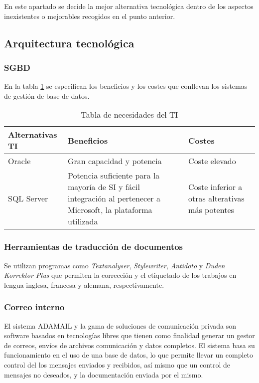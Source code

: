 \documentclass[11pt,a4paper,spanish,twoside]{report}
\begin{document}
En este apartado se decide la mejor alternativa tecnológica
dentro de los aspectos inexistentes o mejorables recogidos en el punto
anterior.

\subsection{Arquitectura tecnológica} \label{ss:7.2.1}
\subsubsection{SGBD}
En la tabla \ref{Tab:TabNecTI} se especifican los beneficios y los costes que
conllevan los sistemas de gestión de base de datos.
\begin{table}[!h]
\centering
  \begin{tabular}{p{3cm}p{4.7cm}p{2.3cm}}
    \textbf{Alternativas TI} & \textbf{Beneficios} &
    \textbf{Costes} \\
    \hline \hline
    Oracle\cite{ora} & Gran capacidad y potencia & Coste elevado\\ \hline
    SQL Server\cite{sql} & Potencia suficiente para la mayoría de SI y fácil
    integración al pertenecer a Microsoft, la plataforma utilizada & Coste
    inferior a otras alterativas más potentes\\ \hline
  \end{tabular}
\caption{Tabla de necesidades del TI} \label{Tab:TabNecTI}
\end{table}

\subsubsection{Herramientas de traducción de documentos}
Se utilizan programas como \emph{Textanalyser}, \emph{Stylewriter},
\emph{Antidoto} y \emph{Duden Korrektor Plus} que permiten la corrección y el
etiquetado de los trabajos en lengua inglesa, francesa y alemana,
respectivamente\cite{tra}. 

\subsubsection{Correo interno}
El sistema ADAMAIL\cite{ada} y la gama de soluciones de comunicación privada
son software basados en tecnologías libres que tienen como finalidad generar un
gestor de correos, envíos de archivos comunicación y datos completos. El
sistema basa su funcionamiento en el uso de una base de datos, lo que permite
llevar un completo control del los mensajes enviados y recibidos, así mismo
que un control de mensajes no deseados, y la documentación enviada por el
mismo. 
\end{document}
